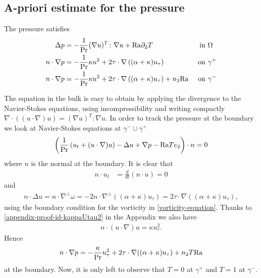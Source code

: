 \documentclass{article}
\theoremstyle{definition}
\theoremstyle{definition}
\newcommand{\gplus}{\gamma^+}
\newcommand{\gminus}{\gamma^-}
\newcommand{\Pra}{\rm{Pr}}
\newcommand{\Ra}{{\rm{Ra}}}
\begin{document}
\subsection{A-priori estimate for the pressure}
\leavevmode

The pressure satisfies
\begin{equation}
    \label{pressure-eq}
    \begin{aligned}
        \Delta p &= -\frac{1}{\Pra}(\nabla u)^T \colon \nabla u +\Ra \partial_2 T   & \textnormal{ in }&\Omega\\
        n\cdot \nabla p &= -\frac{1}{\Pra}\kappa u^2 +2 \tau\cdot\nabla\left((\alpha+\kappa)u_\tau\right)  & \textnormal{ on }&\gamma^+\\
        n\cdot \nabla p &= -\frac{1}{\Pra}\kappa u^2 +2 \tau\cdot\nabla\left((\alpha+\kappa)u_\tau \right) +n_2\Ra  & \textnormal{ on }&\gamma^-
    \end{aligned}
\end{equation}

The equation in the bulk is easy to obtain by applying the divergence to the Navier-Stokes equations, using incompressibility and writing compactly $\nabla\cdot((u\cdot\nabla)u)=(\nabla u)^T:\nabla u$.
In order to track the pressure at the boundary we look at Navier-Stokes equations at $\gminus\cup\gplus$ 
\begin{align*}
    \left(\frac{1}{\Pra}\left( u_t + (u\cdot \nabla)u \right) - \Delta u +  \nabla p - \Ra Te_2\right)\cdot n =0
\end{align*}
where $n$ is the normal at the boundary.
It is clear that
\begin{align*}
    n\cdot u_t &= \frac{d}{dt}(n\cdot u) = 0
\end{align*}
and
\begin{align*}
    n\cdot \Delta u= n \cdot\nabla^\perp \omega =  -2n\cdot \nabla^\perp \left((\alpha+\kappa)u_\tau\right)
    = 2 \tau \cdot \nabla \left((\alpha+\kappa)u_\tau\right),
\end{align*}
using the boundary condition for the vorticity in \eqref{vorticity-equation}.
Thanks to \eqref{appendix-proof-id-kappaUtau2} in the Appendix we also have 
\begin{align}
    \label{id-kappaUtau2-3}
    n\cdot (u\cdot \nabla ) u =\kappa u_\tau^2.
\end{align}
Hence
\begin{align*}
    n\cdot \nabla p = -\frac{\kappa}{\Pra} u_\tau^2 +2\tau \cdot \nabla ((\alpha+\kappa)u_\tau) + n_2T\Ra
\end{align*}
at the boundary. Now, it is only left to observe that $T=0$ at $\gplus$ and $T=1$ at $\gminus$.
\end{document}
